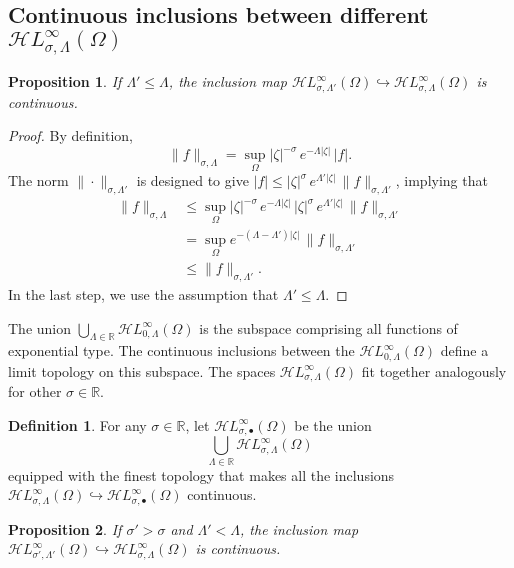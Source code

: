 \documentclass{article}
\theoremstyle{definition}
\newtheorem{definition}{Definition}
\theoremstyle{plain}
\newtheorem{proposition}{Proposition}
\newcommand{\R}{\mathbb{R}}
\newcommand{\singexp}[2]{\mathcal{H}L^\infty_{#1, #2}}
\newcommand{\singexpalg}[1]{\singexp{#1}{\bullet}}
\newcommand{\domain}{\Omega}
\begin{document}
\subsection{Continuous inclusions between different $\singexp{\sigma}{\Lambda}(\Omega)$}\label{sec:inclusions}
\begin{proposition}\label{prop:inclus-ge-exp}
If $\Lambda'\leq\Lambda$, the inclusion map $\singexp{\sigma}{\Lambda'}(\Omega)\hookrightarrow \singexp{\sigma}{\Lambda}(\Omega)$ is continuous.
\end{proposition}
\begin{proof}
By definition,
\[ \|f\|_{\sigma,\Lambda}=\sup_{\Omega} |\zeta|^{-\sigma}\,e^{-\Lambda |\zeta|}\, |f|. \]
The norm $\|\cdot\|_{\sigma, \Lambda'}$ is designed to give $|f| \le |\zeta|^\sigma\,e^{\Lambda'|\zeta|}\,\|f\|_{\sigma, \Lambda'}$, implying that
\begin{align*}
\|f\|_{\sigma,\Lambda} & \leq \sup_{\Omega} |\zeta|^{-\sigma}\,e^{-\Lambda |\zeta|}\,|\zeta|^\sigma\,e^{\Lambda'|\zeta|}\,\|f\|_{\sigma, \Lambda'}\\
&=\sup_{\Omega} e^{-(\Lambda-\Lambda') |\zeta|}\,\|f\|_{\sigma, \Lambda'}\\
&\leq \|f\|_{\sigma,\Lambda'}.
\end{align*}
In the last step, we use the assumption that $\Lambda' \le \Lambda$.
\end{proof}
The union $\bigcup_{\Lambda \in \R} \singexp{0}{\Lambda}(\domain)$ is the subspace comprising all functions of exponential type. The continuous inclusions between the $\singexp{0}{\Lambda}(\domain)$ define a limit topology on this subspace. The spaces $\singexp{\sigma}{\Lambda}(\domain)$ fit together analogously for other $\sigma \in \R$.
\begin{definition}\label{def:exp-top}
For any $\sigma \in \R$, let $\singexpalg{\sigma}(\domain)$ be the union
\[ \bigcup_{\Lambda \in \R} \singexp{\sigma}{\Lambda}(\domain) \]
equipped with the finest topology that makes all the inclusions $\singexp{\sigma}{\Lambda}(\domain) \hookrightarrow \singexpalg{\sigma}(\domain)$ continuous.
\end{definition}
\begin{proposition}\label{prop:inclus-lt-pow-gt-exp}
If $\sigma'>\sigma$ and $\Lambda'<\Lambda$, the inclusion map $\singexp{\sigma'}{\Lambda'}(\Omega)\hookrightarrow \singexp{\sigma}{\Lambda}(\Omega)$ is continuous.
\end{proposition}
\end{document}
